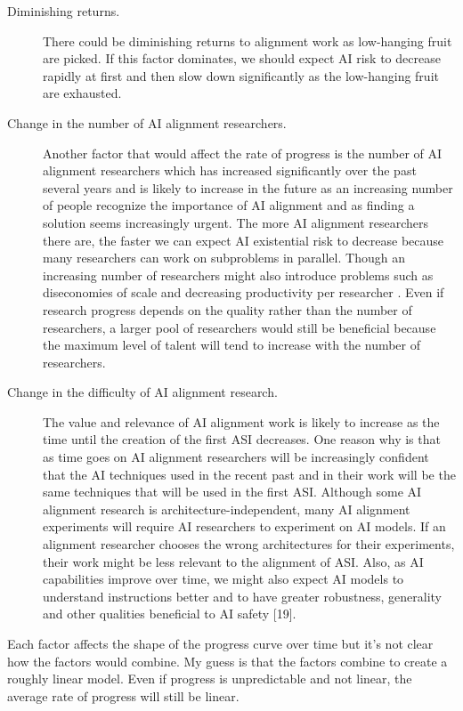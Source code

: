 \documentclass{article}
\begin{document}
\begin{description}
\item[Diminishing returns.] There could be diminishing returns to alignment work as low-hanging fruit are picked. If this factor dominates, we should expect AI risk to decrease rapidly at first and then slow down significantly as the low-hanging fruit are exhausted.
\item[Change in the number of AI alignment researchers.] Another factor that would affect the rate of progress is the number of AI alignment researchers which has increased significantly over the past several years and is likely to increase in the future as an increasing number of people recognize the importance of AI alignment and as finding a solution seems increasingly urgent. The more AI alignment researchers there are, the faster we can expect AI existential risk to decrease because many researchers can work on subproblems in parallel. Though an increasing number of researchers might also introduce problems such as diseconomies of scale and decreasing productivity per researcher \cite{environmentalresearch}. Even if research progress depends on the quality rather than the number of researchers, a larger pool of researchers would still be beneficial because the maximum level of talent will tend to increase with the number of researchers.
\item[Change in the difficulty of AI alignment research.] The value and relevance of AI alignment work is likely to increase as the time until the creation of the first ASI decreases. One reason why is that as time goes on AI alignment researchers will be increasingly confident that the AI techniques used in the recent past and in their work will be the same techniques that will be used in the first ASI. Although some AI alignment research is architecture-independent, many AI alignment experiments will require AI researchers to experiment on AI models. If an alignment researcher chooses the wrong architectures for their experiments, their work might be less relevant to the alignment of ASI. Also, as AI capabilities improve over time, we might also expect AI models to understand instructions better and to have greater robustness, generality and other qualities beneficial to AI safety [19].
\end{description}

Each factor affects the shape of the progress curve over time but it’s not clear how the factors would combine. My guess is that the factors combine to create a roughly linear model. Even if progress is unpredictable and not linear, the average rate of progress will still be linear.
\end{document}
